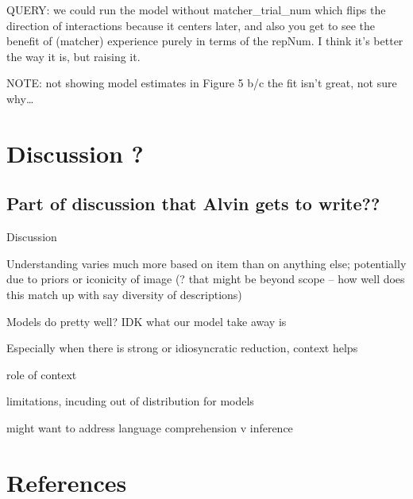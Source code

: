 \documentclass[10pt, letterpaper]{article}
\begin{document}
QUERY: we could run the model without matcher\_trial\_num which flips
the direction of interactions because it centers later, and also you get
to see the benefit of (matcher) experience purely in terms of the
repNum. I think it's better the way it is, but raising it.

NOTE: not showing model estimates in Figure 5 b/c the fit isn't great,
not sure why\ldots{}

\section{Discussion ?}\label{discussion}

\subsection{Part of discussion that Alvin gets to
write??}\label{part-of-discussion-that-alvin-gets-to-write}

Discussion

Understanding varies much more based on item than on anything else;
potentially due to priors or iconicity of image (? that might be beyond
scope -- how well does this match up with say diversity of descriptions)

Models do pretty well? IDK what our model take away is

Especially when there is strong or idiosyncratic reduction, context
helps

role of context

limitations, incuding out of distribution for models

might want to address language comprehension v inference

\section{References}\label{references}

\setlength{\parindent}{-0.1in} 
\setlength{\leftskip}{0.125in}

\noindent
\end{document}
